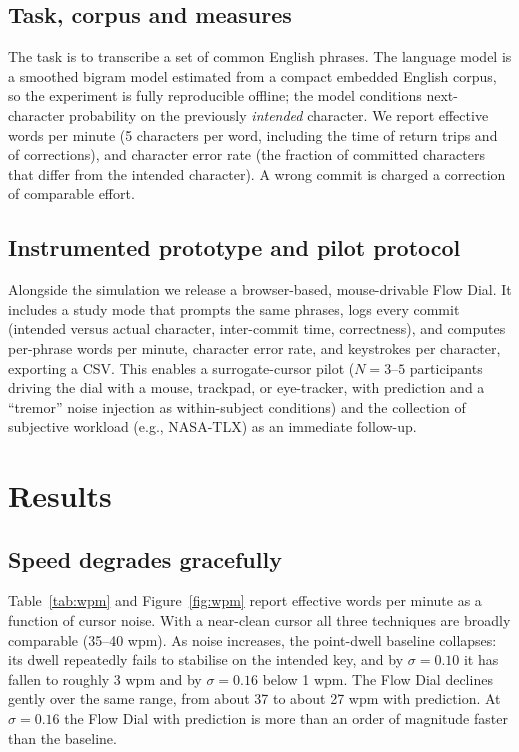\documentclass[manuscript,review,anonymous]{acmart}
\begin{document}
\subsection{Task, corpus and measures}
The task is to transcribe a set of common English phrases. The language model is
a smoothed bigram model estimated from a compact embedded English corpus, so the
experiment is fully reproducible offline; the model conditions next-character
probability on the previously \emph{intended} character. We report effective
words per minute (5 characters per word, including the time of return trips and
of corrections), and character error rate (the fraction of committed characters
that differ from the intended character). A wrong commit is charged a correction
of comparable effort.

\subsection{Instrumented prototype and pilot protocol}
Alongside the simulation we release a browser-based, mouse-drivable Flow Dial.
It includes a study mode that prompts the same phrases, logs every commit
(intended versus actual character, inter-commit time, correctness), and computes
per-phrase words per minute, character error rate, and keystrokes per character,
exporting a CSV. This enables a surrogate-cursor pilot ($N=3$--$5$ participants
driving the dial with a mouse, trackpad, or eye-tracker, with prediction and a
``tremor'' noise injection as within-subject conditions) and the collection of
subjective workload (e.g., NASA-TLX) as an immediate follow-up.

\section{Results}
\subsection{Speed degrades gracefully}
Table~\ref{tab:wpm} and Figure~\ref{fig:wpm} report effective words per minute as
a function of cursor noise. With a near-clean cursor all three techniques are
broadly comparable (35--40 wpm). As noise increases, the point-dwell baseline
collapses: its dwell repeatedly fails to stabilise on the intended key, and by
$\sigma=0.10$ it has fallen to roughly 3 wpm and by $\sigma=0.16$ below 1 wpm.
The Flow Dial declines gently over the same range, from about 37 to about 27 wpm
with prediction. At $\sigma=0.16$ the Flow Dial with prediction is more than an
order of magnitude faster than the baseline.
\end{document}
